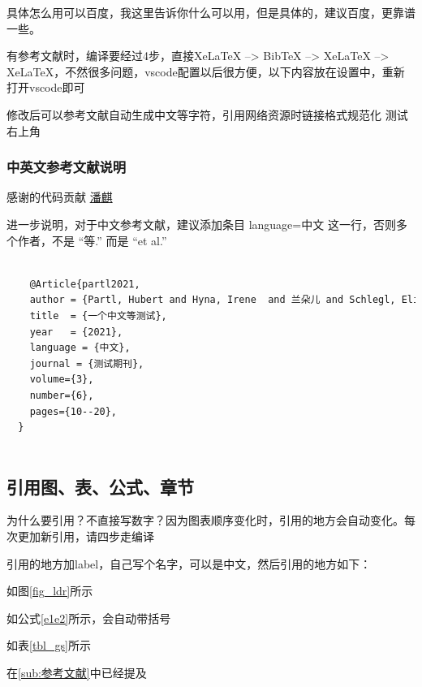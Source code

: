 \documentclass[AutoFakeBold]{LZUThesis}
\begin{document}
具体怎么用可以百度，我这里告诉你什么可以用，但是具体的，建议百度，更靠谱一些。


有参考文献时，编译要经过4步，直接XeLaTeX --> BibTeX --> XeLaTeX --> XeLaTeX，不然很多问题，vscode配置以后很方便，以下内容放在设置中，重新打开vscode即可

修改后可以参考文献自动生成中文等字符，引用网络资源时链接格式规范化
测试右上角 

\subsubsection{中英文参考文献说明} %

感谢的代码贡献
\href{https://gitee.com/versemonger}{潘麒}

进一步说明，对于中文参考文献，建议添加条目 language={中文} 这一行，否则多个作者，不是 “等.” 而是 “et al.”
\begin{lstlisting}[language = tex]

    @Article{partl2021,
    author = {Partl, Hubert and Hyna, Irene  and 兰朵儿 and Schlegl, Elisabeth},
    title  = {一个中文等测试},
    year   = {2021},
    language = {中文},
    journal = {测试期刊},
    volume={3},
    number={6},
    pages={10--20},
  }
  
\end{lstlisting}




\subsection{引用图、表、公式、章节} %

为什么要引用？不直接写数字？因为图表顺序变化时，引用的地方会自动变化。每次更加新引用，请四步走编译

引用的地方加label，自己写个名字，可以是中文，然后引用的地方如下：

如图\ref{fig_ldr}所示

如公式\eqref{e1e2}所示，会自动带括号

如表\ref{tbl_gs}所示

在\ref{sub:参考文献}中已经提及

% 

\backmatter


\printbib
\end{document}
